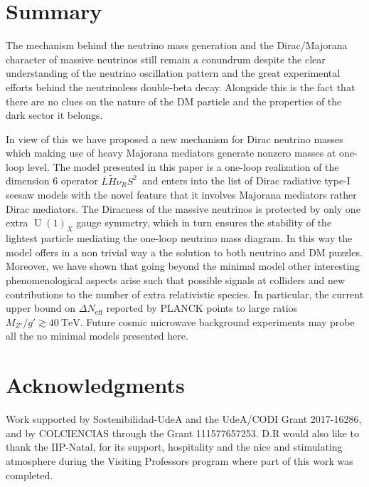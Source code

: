 \documentclass[12pt]{article}
\begin{document}
\section{Summary}
The mechanism behind the neutrino mass generation and the Dirac/Majorana character of massive neutrinos still remain a conundrum despite the clear understanding of the neutrino oscillation pattern and the great experimental efforts behind the neutrinoless double-beta decay. Alongside this is the fact that there are no clues on the nature of the DM particle and the properties of the dark sector it belongs. 

In view of this we have proposed a new mechanism for Dirac neutrino masses which making use of heavy Majorana mediators generate nonzero masses at one-loop level. 
The model presented in this paper is a one-loop realization of the dimension 6 operator $\overline{L} \tilde{H} \nu_R S^2\,$ and enters into the list of Dirac radiative type-I seesaw models with the novel feature that it involves Majorana mediators rather Dirac mediators. 
The Diracness of the massive neutrinos is protected by only one extra $\operatorname{U}(1)_X$ gauge symmetry, which in turn ensures the stability of the lightest particle mediating the one-loop neutrino mass diagram. 
In this way the model offers in a non trivial way a the solution to both neutrino and DM puzzles.
Moreover, we have shown that going beyond the minimal model other interesting phenomenological aspects arise such that possible signals at colliders and new contributions to the number of extra relativistic species. In particular, the  current upper bound on $\Delta N_{\text{eff}}$ reported by PLANCK points to large ratios $M_{Z'}/g'\gtrsim 40\ \text{TeV}$. Future cosmic microwave background experiments may probe all the no minimal models presented here. 

  
\section*{Acknowledgments}
Work supported by Sostenibilidad-UdeA and the UdeA/CODI Grant
2017-16286, and by COLCIENCIAS through the Grant 111577657253. D.R
would also like to thank the IIP-Natal, for its support,
hospitality and the nice and stimulating atmosphere during the
Visiting Professors program where part of this work was completed.
\appendix
\end{document}
